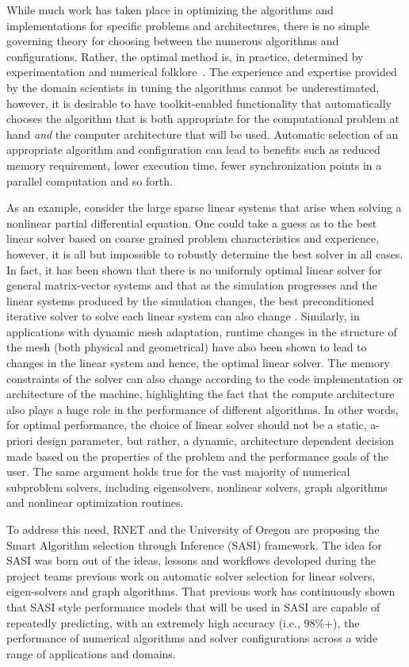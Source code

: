 While much work has taken place in optimizing the algorithms and implementations for specific problems and architectures, there is no simple governing theory for choosing between the numerous algorithms and configurations. Rather, the optimal method is, in practice, determined by experimentation and numerical folklore~\cite{EijkFuen2010:multistage}. The experience and expertise provided by the domain scientists in tuning the algorithms cannot be underestimated, however, it is desirable to have toolkit-enabled functionality that automatically chooses the algorithm that is both appropriate for the computational problem at hand \emph{and} the computer architecture that will be used. Automatic selection of an appropriate algorithm and configuration can lead to benefits such as reduced memory requirement, lower execution time, fewer synchronization points in a parallel computation and so forth. 

As an example, consider the large sparse linear systems that arise when solving a nonlinear partial differential equation. One could take a guess as to the best linear solver based on coarse grained problem characteristics and experience, however, it is all but impossible to robustly determine the best solver in all cases. In fact, it has been shown that there is no uniformly optimal linear solver for general matrix-vector systems and that as the simulation progresses and the linear systems produced by the simulation changes, the best preconditioned iterative solver to solve each linear system can also change \cite{Eller2012}. Similarly, in applications with dynamic mesh adaptation, runtime changes in the structure of the mesh (both physical and geometrical) have also been shown to lead to changes in the linear system and hence, the optimal linear solver. The memory constraints of the solver can also change according to the code implementation or architecture of the machine, highlighting the fact that the compute architecture also plays a huge role in the performance of different algorithms. In other words, for optimal performance, the choice of linear solver should not be a static, a-priori design parameter, but rather, a dynamic, architecture dependent decision made based on the properties of the problem and the performance goals of the user. The same argument holds true for the vast majority of numerical subproblem solvers, including eigensolvers, nonlinear solvers, graph algorithms and nonlinear optimization routines. 

To address this need, RNET and the University of Oregon are proposing the Smart Algorithm selection through Inference (SASI) framework. The idea for SASI was born out of the ideas, lessons and workflows developed during the project teams previous work on automatic solver selection for linear solvers, eigen-solvers and graph algorithms. That previous work has continuously shown that SASI style performance models that will be used in SASI are capable of repeatedly predicting, with an extremely high accuracy (i.e., 98\%+), the performance of numerical algorithms and solver configurations across a wide range of applications and domains.

